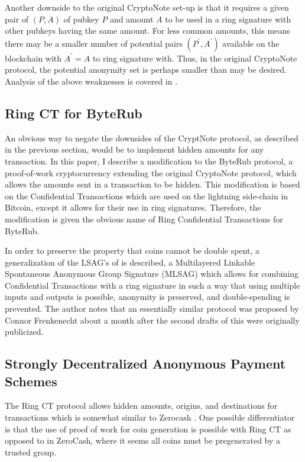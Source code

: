 \documentclass[12pt,oneside,english]{amsart}
\numberwithin{equation}{section}
\numberwithin{figure}{section}
\theoremstyle{plain}
\theoremstyle{plain}
\theoremstyle{remark}
\theoremstyle{plain}
\theoremstyle{remark}
\theoremstyle{remark}
\theoremstyle{plain}
\theoremstyle{definition}
\begin{document}
Another downside to the original CryptoNote set-up is that it requires a given
pair of $\left(P,A\right)$ of pubkey $P$ and amount $A$ to be used in a ring
signature with other pubkeys having the same amount. For less common
amounts, this means there may be a smaller number of potential pairs
$\left(P^{\prime},A^{\prime}\right)$ available on the blockchain
with $A^{\prime}=A$ to ring signature with. Thus, in the original CryptoNote protocol, the potential anonymity set is perhaps smaller than may be desired. 
  Analysis of the above weaknesses is covered in \cite{mrl4}.


\subsection{Ring CT for ByteRub}

An obvious way to negate the downsides of the CryptNote protocol, as described in the previous section, would be to implement hidden amounts for any transaction.
In this
paper, I describe a modification to the ByteRub protocol, a proof-of-work
cryptocurrency extending the original CryptoNote protocol, which allows the amounts sent in
a transaction to be hidden. This modification is based on the Confidential
Transactions \cite{GM} which are used on the lightning side-chain
in Bitcoin, except it allows for their use in ring signatures. Therefore,
the modification is given the obvious name of Ring Confidential Transactions for ByteRub. 

In order to preserve the property that coins cannot be double spent,
a generalization of the LSAG's of \cite{LWW} is described, a Multilayered Linkable
Spontaneous Anonymous Group Signature (MLSAG) which allows for combining
Confidential Transactions with a ring signature in such a way that
using multiple inputs and outputs is possible, anonymity is preserved,
and double-spending is prevented. The author notes that an essentially similar protocol was proposed by Connor Frenkenecht about a month after the second drafts of this were originally publicized. 
\subsection{Strongly Decentralized Anonymous Payment Schemes}
The Ring CT protocol allows hidden amounts, origins, and destinations
for transactions which is somewhat similar to Zerocash \cite{Z}. 
One possible differentiator is that the use of proof of work for coin generation
is possible with Ring CT as opposed to in ZeroCash, where it seems all coins
must be pregenerated by a trusted group.
\end{document}
